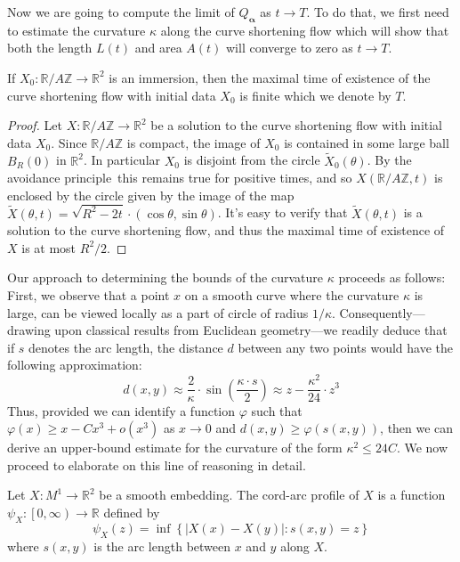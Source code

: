 Now we are going to compute the limit of $Q_{\boldsymbol{\alpha}}$ as $t \to T$. To do that, we first need to estimate the curvature $\kappa$ along the curve shortening flow which will show that both the length $L(t)$ and area $A(t)$ will converge to zero as $t \to T$.
\begin{proposition}\label{prop:I-2-1}
    If $X_0:\mathbb{R}/A\mathbb{Z}\to\mathbb{R}^2$ is an immersion, then the maximal time of existence of the curve shortening flow with initial data $X_0$ is finite which we denote by $T$.
\end{proposition}

\begin{proof}
    Let $X:\mathbb{R}/A\mathbb{Z}\to\mathbb{R}^2$ be a solution to the curve shortening flow with initial data $X_0$. Since $\mathbb{R}/A\mathbb{Z}$ is compact, the image of $X_0$ is contained in some large ball $B_R(0)$ in $\mathbb{R}^2$. In particular $X_0$ is disjoint from the circle $\tilde{X}_0(\theta)$. By the avoidance principle\,\cite{andrews2022extrinsic} this remains true for positive times, and so $X(\mathbb{R}/A\mathbb{Z},t)$ is enclosed by the circle given by the image of the map $\tilde{X}(\theta,t)=\sqrt{R^2-2t}\cdot(\cos{\theta},\sin{\theta})$. It's easy to verify that $\tilde{X}(\theta,t)$ is a solution to the curve shortening flow, and thus the maximal time of existence of $X$ is at most $R^2/2$.
\end{proof}

Our approach to determining the bounds of the curvature $\kappa$ proceeds as follows: First, we observe that a point $x$ on a smooth curve where the curvature $\kappa$ is large, can be viewed locally as a part of circle of radius $1/\kappa$. Consequently—drawing upon classical results from Euclidean geometry—we readily deduce that if $s$ denotes the arc length, the distance $d$ between any two points would have the following approximation:
\begin{equation*}
    d(x,y)\approx \frac{2}{\kappa}\cdot\sin{\left(\frac{\kappa\cdot s}{2}\right)} \approx z-\frac{\kappa^2}{24}\cdot z^3
\end{equation*}
Thus, provided we can identify a function $\varphi$ such that $\varphi(x)\ge x-Cx^3+o(x^3)$ as $x\to 0$ and $d(x,y)\ge\varphi (s(x,y))$, then we can derive an upper-bound estimate for the curvature of the form $\kappa^2\le 24 C$. We now proceed to elaborate on this line of reasoning in detail.

\begin{definition}\label{def:chord-arc profile}
    Let $X:M^1\to\mathbb{R}^2$ be a smooth embedding. The cord-arc profile of $X$ is a function $\psi_X:\left[0,\infty\right)\to\mathbb{R}$ defined by
    \begin{equation}
        \psi_X(z)=\inf{\left\{\left|X(x)-X(y)\right|:s(x,y)=z\right\}}
    \end{equation}
    where $s(x,y)$ is the arc length between $x$ and $y$ along $X$.
\end{definition}


